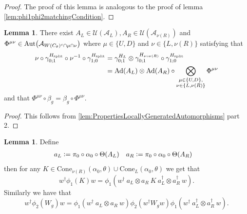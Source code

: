 \documentclass[12pt,a4paper,twoside]{article}
\newcommand{\defeq}{\vcentcolon=}
\let\originalleft\left
\let\originalright\right
\renewcommand{\left}{\mathopen{}\mathclose\bgroup\originalleft}
\renewcommand{\right}{\aftergroup\egroup\originalright}
\newcommand{\UU}{\mathcal U}
\renewcommand{\AA}{\mathcal A}
\newcommand{\Ad}[1]{\textrm{Ad}\left(#1\right)}
\newcommand{\Aut}[1]{\textrm{Aut}\left(#1\right)}
\theoremstyle{definition}
\newtheorem{lemma}[theorem]{Lemma}
\numberwithin{equation}{section}
\begin{document}
\begin{proof}
	The proof of this lemma is analogous to the proof of lemma \ref{lem:phi1phi2matchingCondition}.
\end{proof}
\begin{lemma}
	There exist $A_L\in\UU(\AA_{L}),A_R\in\UU(\AA_{\nu(R)})$ and $\Phi^{\mu\nu}\in\Aut{\AA_{W(C_\theta)^c\cap\mu\cap\nu}}$ where $\mu\in\{U,D\}$ and $\nu\in\{L,\nu(R)\}$ satisfying that
	\begin{align}
		\nu\circ\gamma^{H_{\text{split}}}_{0;1}\circ\nu^{-1}\circ\gamma^{H_{\text{split}}}_{1;0}&=\gamma^{H_L}_{0;1}\otimes\gamma^{H_{\nu\circ\nu(R)}}_{0;1}\circ\gamma^{H_{\text{split}}}_{1;0}\\
		\label{eq:TranslatingSplittedTimeEvolution}
		&=\Ad{A_L}\otimes\Ad{A_R}\circ\bigotimes_{\substack{\mu\in\{U,D\},\\\nu\in\{L,\nu(R)\}}}\Phi^{\mu\nu}
	\end{align}
	and that $\Phi^{\mu\nu}\circ\beta_g=\beta_g\circ\Phi^{\mu\nu}$.
\end{lemma}
\begin{proof}
	This follows from \ref{lem:PropertiesLocallyGeneratedAutomorphisms} part 2.
\end{proof}
\begin{lemma}
	Define
	\begin{align}
		a_L&\defeq \pi_0\circ\alpha_0\circ\Theta(A_L)&a_R&\defeq \pi_0\circ\alpha_0\circ\Theta(A_R)
	\end{align}
	then for any $K\in\text{Cone}_{\nu(R)}(\alpha_0,\theta)\cup\text{Cone}_{L}(\alpha_0,\theta)$ we get that
	\begin{equation}\label{eq:TranslationOutOfPhi_K}
		w^\dagger \phi_1(K)w=\phi_1(w^\dagger \: a_L\otimes a_R \: K \: a_L^\dagger\otimes a_R^\dagger \: w).
	\end{equation}
	Similarly we have that
	\begin{equation}\label{eq:TranslationOutOfPhi_W}
		w^\dagger \phi_2(W_g)w=\phi_1(w^\dagger \: a_L\otimes a_R \: w)\phi_2(w^\dagger W_g w)\phi_1(w^\dagger \: a_L^\dagger\otimes a_R^\dagger \: w).
	\end{equation}
\end{lemma}
\end{document}
